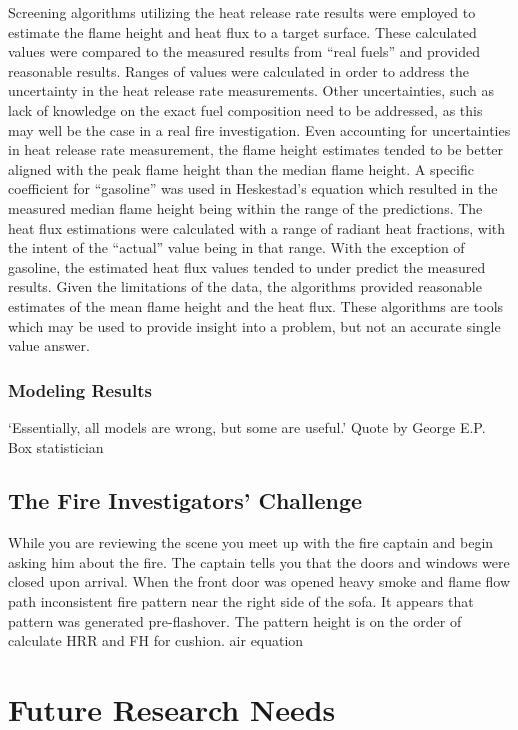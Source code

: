 \documentclass[twoside]{uocthesis}
\begin{document}
{Screening algorithms utilizing the heat release rate results were employed to estimate the flame height and heat flux to a target surface.  These calculated values were compared to the measured results from “real fuels” and provided reasonable results.  Ranges of values were calculated in order to address the uncertainty in the heat release rate measurements.  Other uncertainties, such as lack of knowledge on the exact fuel composition need to be addressed, as this may well be the case in a real fire investigation.  Even accounting for uncertainties in heat release rate measurement, the flame height estimates tended to be better aligned with the peak flame height than the median flame height.  A specific coefficient for “gasoline” was used in Heskestad’s equation which resulted in the measured median flame height being within the range of the predictions.  The heat flux estimations were calculated with a range of radiant heat fractions, with the intent of the “actual” value being in that range.  With the exception of gasoline, the estimated heat flux values tended to under predict the measured results.  Given the limitations of the data, the algorithms provided reasonable estimates of the mean flame height and the heat flux.  These algorithms are tools which may be used to provide insight into a problem, but not an accurate single value answer. 

\subsection{Modeling Results}

`Essentially, all models are wrong, but some are useful.'   Quote by George E.P. Box  statistician


\section{The Fire Investigators' Challenge}

While you are reviewing the scene you meet up with the fire captain and begin asking him about the fire.  The captain tells you that the doors and windows were closed upon arrival.  When the front door was opened heavy smoke and flame 
flow path
inconsistent fire pattern near the right side of the sofa.  It appears that pattern was generated pre-flashover.  The pattern height is on the order of   calculate HRR and FH for cushion.
air equation

\chapter{Future Research Needs}



}
\end{document}
